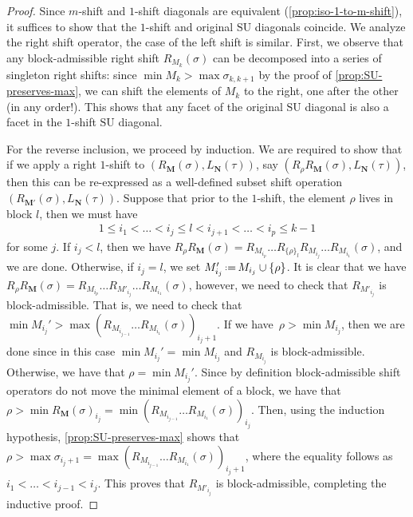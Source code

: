 \documentclass{amsart}
\theoremstyle{definition}
\newcommand{\eqdef}{\mbox{\,\raisebox{0.2ex}{\scriptsize\ensuremath{\mathrm:}}\ensuremath{=}\,}} %
\newcommand{\SU}{\mathrm{SU}}
\begin{document}
\begin{proof}
Since $m$-shift and $1$-shift diagonals are equivalent (\cref{prop:iso-1-to-m-shift}), it suffices to show that the $1$-shift and original $\SU$ diagonals coincide. 
We analyze the right shift operator, the case of the left shift is similar. 
First, we observe that any block-admissible right shift $R_{M_k}(\sigma)$ can be decomposed into a series of singleton right shifts: since $\min M_k > \max \sigma_{k,k+1}$ by the proof of \cref{prop:SU-preserves-max}, we can shift the elements of $M_k$ to the right, one after the other (in any order!).
This shows that any facet of the original $\SU$ diagonal is also a facet in the $1$-shift $\SU$ diagonal.

For the reverse inclusion, we proceed by induction. 
We are required to show that if we apply a right $1$-shift to $(R_{\mathbf{M}}(\sigma),L_{\mathbf{N}}(\tau))$, say $(R_{\rho}R_{\mathbf{M}}(\sigma),L_{\mathbf{N}}(\tau))$, then this can be re-expressed as a well-defined subset shift operation $(R_{\mathbf{M'}}(\sigma),L_{\mathbf{N}}(\tau))$. 
Suppose that prior to the $1$-shift, the element $\rho$ lives in block $l$, then we must have
\begin{align*}
	1 \leq i_1 < \dots < i_j \leq l < i_{j+1} <\dots< i_p \leq k-1
\end{align*}
for some $j$. 
If $i_j < l$, then we have $R_{\rho}R_{\mathbf{M}}(\sigma) = R_{M_{i_p}}\dots R_{\{\rho\}_{l}}R_{M_{i_j}}\dots R_{M_{i_1}}(\sigma)$, and we are done.
Otherwise, if $i_j = l$, we set $M'_{i_j} \eqdef M_{i_j} \cup \{\rho \}$. 
It is clear that we have $R_{\rho}R_{\mathbf{M}}(\sigma) = R_{M_{i_p}}\dots R_{M'_{i_j}}\dots R_{M_{i_1}}(\sigma)$, however, we need to check that $R_{M'_{i_j}}$ is block-admissible. 
That is, we need to check that $\min M_{i_j}' > \max (R_{M_{i_{j-1}}}\dots R_{M_{i_1}}(\sigma))_{i_j+1}$.
If we have~$\rho > \min M_{i_j}$, then we are done since in this case $\min M_{i_j}'=\min M_{i_j}$ and $R_{M_{i_j}}$ is block-admissible.
Otherwise, we have that $\rho=\min M_{i_j}'$. 
Since by definition block-admissible shift operators do not move the minimal element of a block, we have that $\rho > \min R_{\mathbf{M}}(\sigma)_{i_j}= \min (R_{M_{i_{j-1}}}\dots R_{M_{i_1}}(\sigma))_{i_j}$.
Then, using the induction hypothesis, \cref{prop:SU-preserves-max} shows that $\rho>\max \sigma_{i_j+1} = \max (R_{M_{i_{j-1}}}\dots R_{M_{i_1}}(\sigma))_{i_j + 1}$, where the equality follows as $i_1<\dots<i_{j-1}<i_j$. 
This proves that $R_{M'_{i_j}}$ is block-admissible, completing the inductive proof.
\end{proof}
\end{document}
